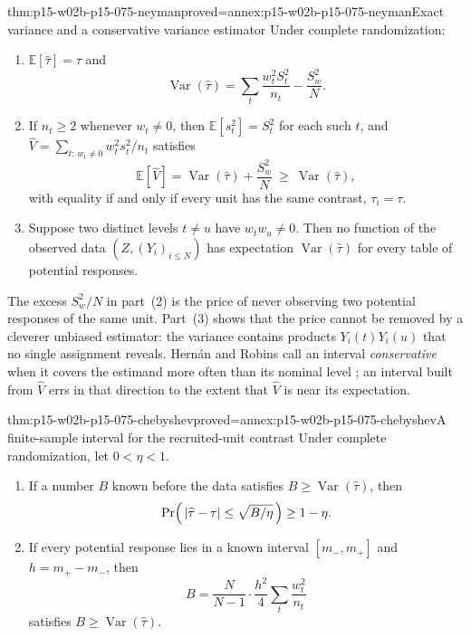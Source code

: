 \begin{hbtheorem}{thm:p15-w02b-p15-075-neyman}{proved=annex:p15-w02b-p15-075-neyman}{Exact variance and a conservative variance estimator}
Under complete randomization:
\begin{enumerate}
\item \(\mathbb E[\widehat\tau]=\tau\) and
\[
 \operatorname{Var}(\widehat\tau)
 =\sum_t\frac{w_t^2S_t^2}{n_t}-\frac{S_w^2}{N}.
\]
\item If \(n_t\geq2\) whenever \(w_t\neq0\), then
\(\mathbb E[s_t^2]=S_t^2\) for each such \(t\), and
\(\widehat V=\sum_{t:\,w_t\neq0}w_t^2s_t^2/n_t\) satisfies
\[
 \mathbb E[\widehat V]=\operatorname{Var}(\widehat\tau)+\frac{S_w^2}{N}
 \ \geq\ \operatorname{Var}(\widehat\tau),
\]
with equality if and only if every unit has the same contrast,
\(\tau_i=\tau\).
\item Suppose two distinct levels \(t\neq u\) have \(w_tw_u\neq0\). Then no
function of the observed data \((Z,(Y_i)_{i\leq N})\) has expectation
\(\operatorname{Var}(\widehat\tau)\) for every table of potential responses.
\end{enumerate}
\end{hbtheorem}

The excess \(S_w^2/N\) in part~(2) is the price of never observing two
potential responses of the same unit. Part~(3) shows that the price cannot be
removed by a cleverer unbiased estimator: the variance contains products
\(Y_i(t)Y_i(u)\) that no single assignment reveals. Hern\'an and Robins call an
interval \emph{conservative} when it covers the estimand more often than its
nominal level \cite[\S10.1, p.~139]{HernanRobins2020WhatIf2026}; an interval
built from \(\widehat V\) errs in that direction to the extent that
\(\widehat V\) is near its expectation.

\begin{hbtheorem}{thm:p15-w02b-p15-075-chebyshev}{proved=annex:p15-w02b-p15-075-chebyshev}{A finite-sample interval for the recruited-unit contrast}
Under complete randomization, let \(0<\eta<1\).
\begin{enumerate}
\item If a number \(B\) known before the data satisfies
\(B\geq\operatorname{Var}(\widehat\tau)\), then
\[
 \Pr\Bigl(\,|\widehat\tau-\tau|\leq\sqrt{B/\eta}\,\Bigr)\geq1-\eta .
\]
\item If every potential response lies in a known interval \([m_-,m_+]\)
and \(h=m_+-m_-\), then
\[
 B=\frac{N}{N-1}\cdot\frac{h^2}{4}\sum_t\frac{w_t^2}{n_t}
\]
satisfies \(B\geq\operatorname{Var}(\widehat\tau)\).
\end{enumerate}
\end{hbtheorem}


